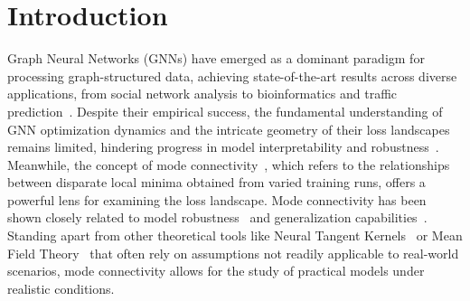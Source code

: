 \section{Introduction}









Graph Neural Networks (GNNs) have emerged as a dominant paradigm for processing graph-structured data, achieving state-of-the-art results across diverse applications, from social network analysis to bioinformatics and traffic prediction~\citep{ma2021deep,wang2020traffic}. Despite their empirical success, the fundamental understanding of GNN optimization dynamics and the intricate geometry of their loss landscapes remains limited, hindering progress in model interpretability and robustness~\cite{jin2020graph}. Meanwhile, the concept of mode connectivity~\citep{garipov2018loss, draxler2018essentially}, which refers to the relationships between disparate local minima obtained from varied training runs, offers a powerful lens for examining the loss landscape. Mode connectivity has been shown closely related to model robustness~\citep{zhao2020bridging} and generalization capabilities~\citep{vrabel2024input}. Standing apart from other theoretical tools like Neural Tangent Kernels~\citep{yanggraph} or Mean Field Theory~\citep{aminian2024generalization} that often rely on assumptions not readily applicable to real-world scenarios, mode connectivity allows for the study of practical models under realistic conditions.


